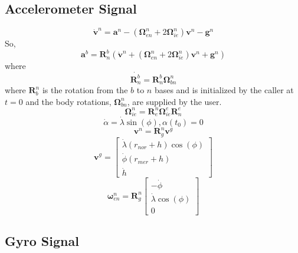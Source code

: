 \documentclass[a4paper]{report}
\numberwithin{equation}{chapter}
\newcommand{\mat}[1]{\boldsymbol{#1}}
\begin{document}
\subsection[Accelerometer Signal]{Accelerometer Signal}

\begin{equation}
\dot{\mat{v}}^n = \mat{a}^n - \left( \mat{\Omega}^n_{en} + 2 \mat{\Omega}^n_{ie} \right) \mat{v}^n - \mat{g}^n
\end{equation}
So,
\begin{equation}
\mat{a}^b = \mat{R}^b_n \left( \dot{\mat{v}}^n + \left( \mat{\Omega}^n_{en} + 2 \mat{\Omega}^n_{ie} \right) \mat{v}^n + \mat{g}^n \right)
\end{equation}
where
\begin{equation}
\dot{\mat{R}^b_n} = \mat{R}^b_n  \mat{\Omega}^n_{bn}
\end{equation}
where $\mat{R}^n_b$ is the rotation from the $b$ to $n$ bases and is initialized by the caller at $t = 0$ and the body rotations, $\mat{\Omega}^n_{bn}$, are supplied by the user.
\begin{equation}
\mat{\Omega}^n_{ie} = \mat{R}^n_e \mat{\Omega}^e_{ie} \mat{R}^e_n
\end{equation}
\begin{equation}
\dot{\alpha} = \dot{\lambda} \sin \left( \phi \right), \alpha \left( t_0 \right) = 0
\end{equation}
\begin{equation}
\mat{v}^n = \mat{R}^n_g \mat{v}^g
\end{equation}
\begin{equation}
\mat{v}^g =
\begin{bmatrix}
\dot{\lambda} \left( r_{nor} + h \right) \cos \left( \phi \right) \\
\dot{\phi} \left( r_{mer} + h \right) \\
\dot{h}
\end{bmatrix}
\end{equation}
\begin{equation}
\mat{\omega}^n_{en} = \mat{R}^n_g
\begin{bmatrix}
-\dot{\phi} \\
\dot{\lambda} \cos \left( \phi \right) \\
0
\end{bmatrix}
\end{equation}

\subsection[Gyro Signal]{Gyro Signal}
\end{document}
